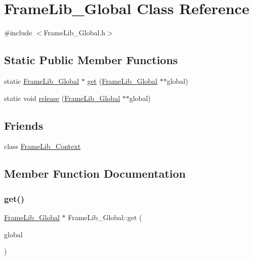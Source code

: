 \hypertarget{class_frame_lib___global}{}\section{Frame\+Lib\+\_\+\+Global Class Reference}
\label{class_frame_lib___global}


{\ttfamily \#include $<$Frame\+Lib\+\_\+\+Global.\+h$>$}

\subsection*{Static Public Member Functions}
\begin{DoxyCompactItemize}
\item 
static \hyperlink{class_frame_lib___global}{Frame\+Lib\+\_\+\+Global} $\ast$ \hyperlink{class_frame_lib___global_ac9a895677da386e8fde525c061a854e4}{get} (\hyperlink{class_frame_lib___global}{Frame\+Lib\+\_\+\+Global} $\ast$$\ast$global)
\item 
static void \hyperlink{class_frame_lib___global_a079e2b866b66d477ae551e0b0e12ea11}{release} (\hyperlink{class_frame_lib___global}{Frame\+Lib\+\_\+\+Global} $\ast$$\ast$global)
\end{DoxyCompactItemize}
\subsection*{Friends}
\begin{DoxyCompactItemize}
\item 
class \hyperlink{class_frame_lib___global_a6a4d0dd2956393d740d97600370f6ef8}{Frame\+Lib\+\_\+\+Context}
\end{DoxyCompactItemize}


\subsection{Member Function Documentation}
\mbox{\label{class_frame_lib___global_ac9a895677da386e8fde525c061a854e4}} 
\subsubsection{\texorpdfstring{get()}{get()}}
{\footnotesize\ttfamily \hyperlink{class_frame_lib___global}{Frame\+Lib\+\_\+\+Global} $\ast$ Frame\+Lib\+\_\+\+Global\+::get (\begin{DoxyParamCaption}\item[{\hyperlink{class_frame_lib___global}{Frame\+Lib\+\_\+\+Global} $\ast$$\ast$}]{global }\end{DoxyParamCaption})\hspace{0.3cm}{\ttfamily [static]}}


